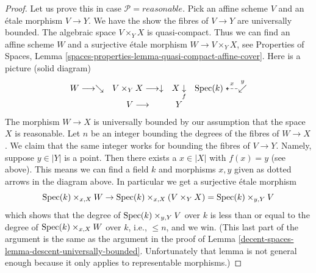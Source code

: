\begin{proof}
\medskip\noindent
Let us prove this in case $\mathcal{P} = reasonable$.
Pick an affine scheme $V$ and an \'etale morphism $V \to Y$.
We have the show the fibres of $V \to Y$ are universally bounded.
The algebraic space $V \times_Y X$ is quasi-compact.
Thus we can find an affine scheme $W$ and a surjective \'etale morphism
$W \to V \times_Y X$, see
Properties of Spaces,
Lemma \ref{spaces-properties-lemma-quasi-compact-affine-cover}.
Here is a picture (solid diagram)
$$
\begin{array}{cccc}W \longrightarrow\searrow & V \times_Y X \longrightarrow\downarrow & X \underset{f}{\downarrow} & \operatorname{Spec}(k) \overset{x}{\dashleftarrow}\overset{y}{\swarrow} \\  & V \longrightarrow & Y & \end{array}
$$
The morphism $W \to X$ is universally bounded by our assumption that
the space $X$ is reasonable. Let $n$ be an integer bounding
the degrees of the fibres of $W \to X$. We claim that the same integer
works for bounding the fibres of $V \to Y$. Namely, suppose $y \in |Y|$
is a point. Then there exists a $x \in |X|$ with $f(x) = y$ (see above).
This means we can find a field $k$ and morphisms $x, y$ given as dotted
arrows in the diagram above. In particular we get a surjective \'etale
morphism
$$
\operatorname{Spec}(k) \times_{x, X} W
\to
\operatorname{Spec}(k) \times_{x, X} (V \times_Y X) = \operatorname{Spec}(k) \times_{y, Y} V
$$
which shows that the degree of $\operatorname{Spec}(k) \times_{y, Y} V$ over $k$
is less than or equal to the degree of $\operatorname{Spec}(k) \times_{x, X} W$
over $k$, i.e., $\leq n$, and we win. (This last part of the argument
is the same as the argument in the proof of
Lemma \ref{decent-spaces-lemma-descent-universally-bounded}.
Unfortunately that lemma is not general enough because it only applies
to representable morphisms.)
\end{proof}

